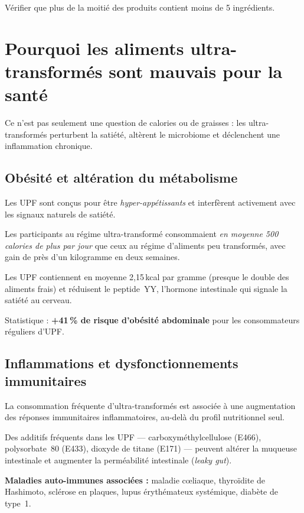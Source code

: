 \documentclass[a5paper,12pt,oneside,openany]{book}
\newcommand{\boxvert}[2]{%
  \begin{tcolorbox}[boitebase,
    colback=verdescuro!8!white, colframe=verdescuro, title={#1}]
  #2\end{tcolorbox}}
\newcommand{\boxinfo}[2]{%
  \begin{tcolorbox}[boitebase,
    colback=bleuinfo!8!white, colframe=bleuinfo, title={#1}]
  #2\end{tcolorbox}}
\begin{document}
\boxvert{Test du caddie}{Vérifier que plus de la moitié des produits contient
moins de 5 ingrédients.}

\chapter{Pourquoi les aliments ultra-transformés sont mauvais pour la santé}

Ce n'est pas seulement une question de calories ou de graisses : les
ultra-transformés perturbent la satiété, altèrent le microbiome et déclenchent
une inflammation chronique.

\section{Obésité et altération du métabolisme}

Les UPF sont conçus pour être \emph{hyper-appétissants} et interfèrent
activement avec les signaux naturels de satiété.

\boxinfo{Étude Kevin Hall (NIH, 2019)}{Les participants au régime
ultra-transformé consommaient \emph{en moyenne 500 calories de plus par jour}
que ceux au régime d'aliments peu transformés, avec gain de près d'un kilogramme
en deux semaines.}

Les UPF contiennent en moyenne 2,15\,kcal par gramme (presque le double des
aliments frais) et réduisent le peptide~YY, l'hormone intestinale qui signale
la satiété au cerveau.

Statistique : \textbf{+41\,\% de risque d'obésité abdominale} pour les
consommateurs réguliers d'UPF.

\section{Inflammations et dysfonctionnements immunitaires}

La consommation fréquente d'ultra-transformés est associée à une augmentation
des réponses immunitaires inflammatoires, au-delà du profil nutritionnel seul.

Des additifs fréquents dans les UPF --- carboxyméthylcellulose (E466),
polysorbate~80 (E433), dioxyde de titane (E171) --- peuvent altérer la muqueuse
intestinale et augmenter la perméabilité intestinale (\textit{leaky gut}).

\textbf{Maladies auto-immunes associées :} maladie cœliaque, thyroïdite de
Hashimoto, sclérose en plaques, lupus érythémateux systémique, diabète
de type~1.
\end{document}
